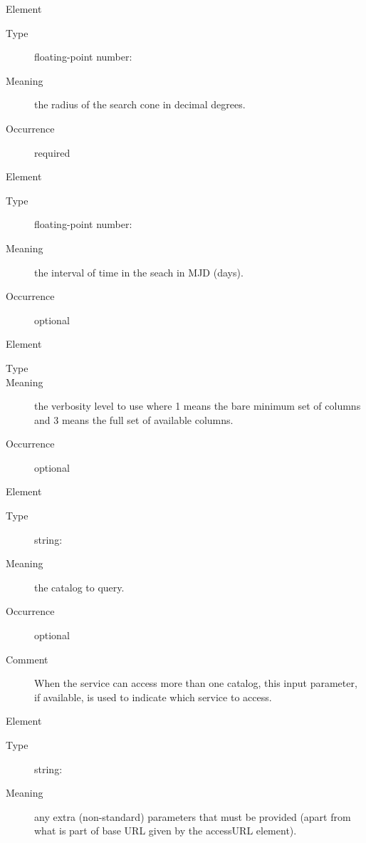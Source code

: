 \documentclass[11pt,a4paper]{ivoa} 
\begin{document}
\begin{generated}
\begin{bigdescription}
\begin{description}
\end{description} \item[Element \xmlel{sr}] \begin{description}
\item[Type] floating-point number:  \item[Meaning] the
radius of the search cone in decimal degrees.
               
\item[Occurrence] required

\end{description}

               

\item[Element \xmlel{time}] \begin{description} \item[Type]
floating-point number:  \item[Meaning] the interval of
time in the seach in MJD (days).  \item[Occurrence] optional

\end{description}


\item[Element \xmlel{verb}] \begin{description} \item[Type]
 \item[Meaning] the verbosity level to use
where 1 means the bare minimum set of columns and 3 means the full set
of available columns.
               
\item[Occurrence] optional 

\end{description} \item[Element \xmlel{catalog}] \begin{description}
\item[Type] string:  \item[Meaning] the catalog to
query.  
               
\item[Occurrence] optional \item[Comment] When the service can access
more than one catalog, this input parameter, if available, is used to
indicate which service to access.
               

\end{description} \item[Element \xmlel{extras}] \begin{description}
\item[Type] string:  \item[Meaning] any extra
(non-standard) parameters that must be provided (apart from what is part
of base URL given by the accessURL element).
               

\end{description}
\end{bigdescription}
\end{generated}
\end{document}
